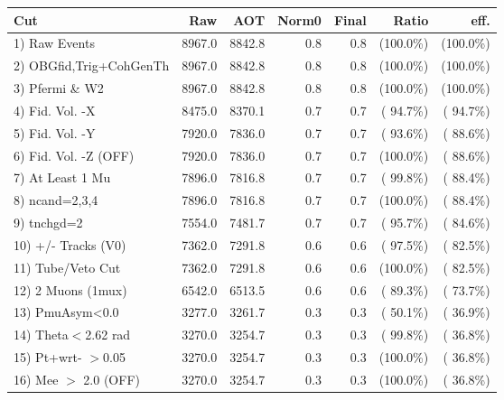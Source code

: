  \begin{table}[h!]\centering
 \begin{tabular}{||l||r|r|r|r|r|r||}
 \hline
 \hline
 Cut & Raw & AOT & Norm0 & Final & Ratio & eff.       \\
 \hline
  1) Raw Events           &       8967.0 &       8842.8 &          0.8 &          0.8 & (100.0\%) & (100.0\%) \\
  2) OBGfid,Trig+CohGenTh &       8967.0 &       8842.8 &          0.8 &          0.8 & (100.0\%) & (100.0\%) \\
  3) Pfermi \& W2         &       8967.0 &       8842.8 &          0.8 &          0.8 & (100.0\%) & (100.0\%) \\
  4) Fid. Vol. -X         &       8475.0 &       8370.1 &          0.7 &          0.7 & ( 94.7\%) & ( 94.7\%) \\
  5) Fid. Vol. -Y         &       7920.0 &       7836.0 &          0.7 &          0.7 & ( 93.6\%) & ( 88.6\%) \\
  6) Fid. Vol. -Z (OFF)   &       7920.0 &       7836.0 &          0.7 &          0.7 & (100.0\%) & ( 88.6\%) \\
  7) At Least 1 Mu        &       7896.0 &       7816.8 &          0.7 &          0.7 & ( 99.8\%) & ( 88.4\%) \\
  8) ncand=2,3,4          &       7896.0 &       7816.8 &          0.7 &          0.7 & (100.0\%) & ( 88.4\%) \\
  9) tnchgd=2             &       7554.0 &       7481.7 &          0.7 &          0.7 & ( 95.7\%) & ( 84.6\%) \\
 10) +/- Tracks (V0)      &       7362.0 &       7291.8 &          0.6 &          0.6 & ( 97.5\%) & ( 82.5\%) \\
 11) Tube/Veto Cut        &       7362.0 &       7291.8 &          0.6 &          0.6 & (100.0\%) & ( 82.5\%) \\
 12) 2 Muons (1mux)       &       6542.0 &       6513.5 &          0.6 &          0.6 & ( 89.3\%) & ( 73.7\%) \\
 13) PmuAsym<0.0          &       3277.0 &       3261.7 &          0.3 &          0.3 & ( 50.1\%) & ( 36.9\%) \\
 14) Theta$<$2.62 rad     &       3270.0 &       3254.7 &          0.3 &          0.3 & ( 99.8\%) & ( 36.8\%) \\
 15) Pt+wrt- $>$0.05      &       3270.0 &       3254.7 &          0.3 &          0.3 & (100.0\%) & ( 36.8\%) \\
 16) Mee $>$ 2.0  (OFF)   &       3270.0 &       3254.7 &          0.3 &          0.3 & (100.0\%) & ( 36.8\%) \\

\end{tabular}
\end{table}
